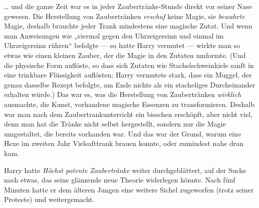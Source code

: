 … und die ganze Zeit war es in jeder Zaubertränke-Stunde direkt vor seiner Nase gewesen. Die Herstellung von Zaubertränken \emph{erschuf} keine Magie, sie \emph{bewahrte} Magie, deshalb brauchte jeder Trank mindestens eine magische Zutat. Und wenn man Anweisungen wie „viermal gegen den Uhrzeigersinn und einmal im Uhrzeigersinn rühren“ befolgte — so hatte Harry vermutet — wirkte man so etwas wie einen kleinen Zauber, der die Magie in den Zutaten umformte. (Und die physische Form auflöste, so dass sich Zutaten wie Stachelschweinkiele sanft in eine trinkbare Flüssigkeit auflösten; Harry vermutete stark, dass ein Muggel, der genau dasselbe Rezept befolgte, am Ende nichts als ein stacheliges Durcheinander erhalten würde.) Das war es, was die Herstellung von Zaubertränken \emph{wirklich} ausmachte, die Kunst, vorhandene magische Essenzen zu transformieren. Deshalb war man nach dem Zaubertrankunterricht ein bisschen erschöpft, aber nicht viel, denn man hat die Tränke nicht selbst hergestellt, sondern nur die Magie umgestaltet, die bereits vorhanden war. Und das war der Grund, warum eine Hexe im zweiten Jahr Vielsafttrank brauen konnte, oder zumindest nahe dran kam.

Harry hatte \emph{Höchst potente Zaubertränke} weiter durchgeblättert, auf der Suche nach etwas, das seine glänzende neue Theorie widerlegen könnte. Nach fünf Minuten hatte er dem älteren Jungen eine weitere Sichel zugeworfen (trotz seiner Proteste) und weitergemacht.

